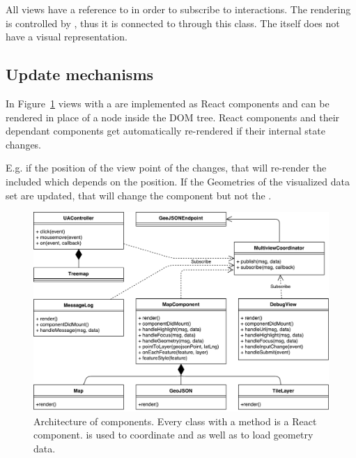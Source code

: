 All views have a reference to  in order to subscribe to interactions.
The rendering \tmap{} is controlled by , thus it is connected to  through this class.
The  itself does not have a visual representation.

\subsection{Update mechanisms}
In Figure~\ref{fig:implementation:architecture} views with a  are implemented as React components and can be rendered in place of a node inside the DOM tree.
React components and their dependant components get automatically re-rendered if their internal state changes.

E.g. if the position of the view point of the  changes, that will re-render the included  which depends on the position.
If the Geometries of the visualized data set are updated, that will change the  component but not the .



\begin{figure}[ht]
  \centering
  \includegraphics[width=\textwidth]{figures/implementation/Architecture.pdf}
  \caption{%
    Architecture of components.
    Every class with a  method is a React component.
     is used to coordinate \tmap{} and \gv{} as well as to load geometry data.
  }\label{fig:implementation:architecture}
\end{figure}

